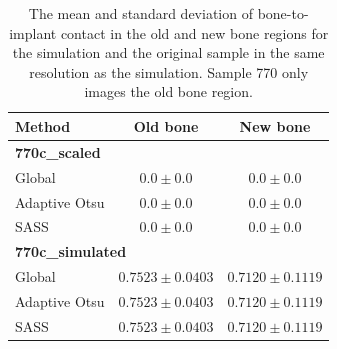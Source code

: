 \begin{table}
    \caption{
	    The mean and standard deviation of bone-to-implant contact in the
	    old and new bone regions for the simulation and the original sample
	    in the same resolution as the simulation. Sample 770 only images
	    the old bone region.
	    }
    \label{tab:bic-sim}
    \centering
    \begin{tabular}{lcc}
        \toprule
        Method & Old bone & New bone \\
        \toprule
	\multicolumn{3}{l}{\textbf{770c\_scaled}} \\
	\midrule
        Global & $0.0 \pm 0.0$ & $0.0 \pm 0.0$ \\
        Adaptive Otsu & $0.0 \pm 0.0$ & $0.0 \pm 0.0$ \\
        SASS & $0.0 \pm 0.0$ & $0.0 \pm 0.0$ \\
	\toprule
	\multicolumn{3}{l}{\textbf{770c\_simulated}} \\
	\midrule
	Global & $0.7523 \pm 0.0403$ & $0.7120 \pm 0.1119$ \\
	Adaptive Otsu & $0.7523 \pm 0.0403$ & $0.7120 \pm 0.1119$ \\
	SASS & $0.7523 \pm 0.0403$ & $0.7120 \pm 0.1119$ \\
        \bottomrule
    \end{tabular}
\end{table}
